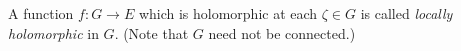 A function $f: G \rightarrow E$ which is holomorphic at each $\zeta \in G$ is called \emph{locally holomorphic} in $G$. (Note that $G$ need not be connected.)
